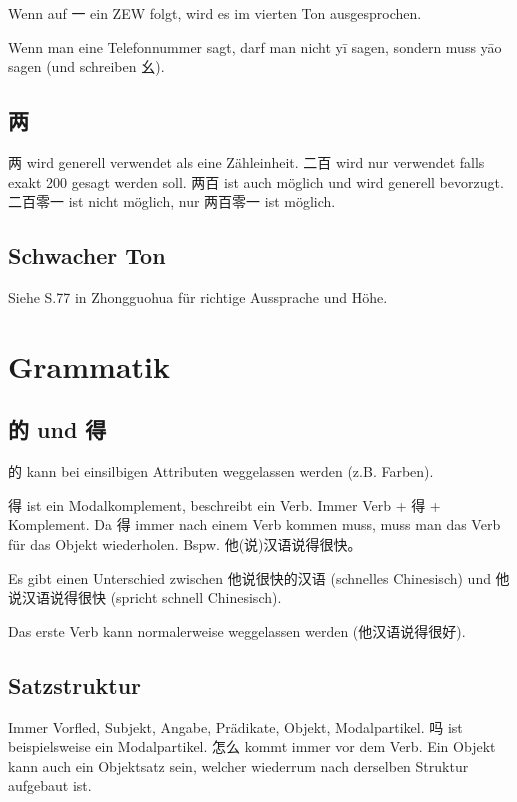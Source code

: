 \documentclass[UTF8]{ctexart}
\begin{document}
Wenn auf 一 ein ZEW folgt, wird es im vierten Ton ausgesprochen.

Wenn man eine Telefonnummer sagt, darf man nicht yī sagen, sondern muss yāo sagen (und schreiben 幺).

\subsection{两}

两 wird generell verwendet als eine Zähleinheit. 二百 wird nur verwendet falls exakt 200 gesagt werden soll. 两百 ist auch möglich und wird generell bevorzugt. 二百零一 ist nicht möglich, nur 两百零一 ist möglich.

\subsection{Schwacher Ton}

Siehe S.77 in Zhongguohua für richtige Aussprache und Höhe.

\section{Grammatik}

\subsection{的 und 得}

的 kann bei einsilbigen Attributen weggelassen werden (z.B. Farben).

得 ist ein Modalkomplement, beschreibt ein Verb. Immer Verb + 得 + Komplement. Da 得 immer nach einem Verb kommen muss, muss man das Verb für das Objekt wiederholen. Bspw. 他(说)汉语说得很快。

Es gibt einen Unterschied zwischen 他说很快的汉语 (schnelles Chinesisch) und 他说汉语说得很快 (spricht schnell Chinesisch).

Das erste Verb kann normalerweise weggelassen werden (他汉语说得很好).

\subsection{Satzstruktur}

Immer Vorfled, Subjekt, Angabe, Prädikate, Objekt, Modalpartikel.
吗 ist beispielsweise ein Modalpartikel. 怎么 kommt immer vor dem Verb. Ein Objekt kann auch ein Objektsatz sein, welcher wiederrum nach derselben Struktur aufgebaut ist.
\end{document}
